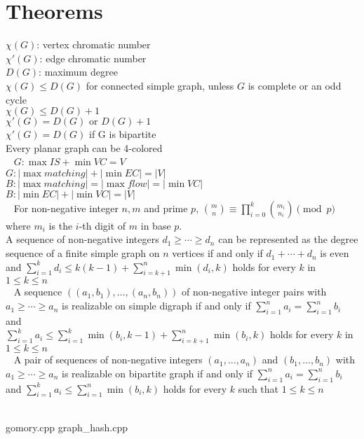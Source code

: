 \documentclass [landscape,8pt,a4paper,twocolumn]{article}
\begin{document}
\part{Theorems}
$\chi(G)$: vertex chromatic number \\
$\chi'(G)$: edge chromatic number \\
$D(G)$: maximum degree \\
$\chi(G) \leq D(G)$ for connected simple graph, unless $G$ is complete or an odd cycle \\
$\chi(G) \leq D(G)+1$ \\
$\chi'(G)=D(G) \text{ or } D(G)+1$ \\
$\chi'(G)=D(G)$ if G is bipartite \\
Every planar graph can be 4-colored \\
~\newline
$G: \max IS+\min VC=V$ \\
$G: |\max matching|+|\min EC|=|V|$ \\
$B: |\max matching|=|\max flow|=|\min VC|$ \\
$B: |\min EC|+|\min VC|=|V|$ \\
~\newline
For non-negative integer $n,m$ and prime $p$, $\binom{m}{n}\equiv\prod_{i=0}^k\binom{m_i}{n_i}\pmod p$\\
	where $m_i$ is the $i$-th digit of $m$ in base $p$. \\
\vfill\null
A sequence of non-negative integers $d_1\geq\cdots\geq d_n$ can be represented as the degree sequence of a finite simple graph on $n$ vertices if and only if $d_1+\cdots+d_n$ is even and $\sum^{k}_{i=1}d_i\leq k(k-1)+ \sum^n_{i=k+1} \min(d_i,k)$
holds for every $k$ in $1\leq k\leq n$ \\
~\newline
A sequence $((a_1,b_1 ),\ldots,(a_n,b_n))$ of non-negative integer pairs with $a_1\geq\cdots\geq a_n$ is realizable on simple digraph if and only if $\sum_{i=1}^{n}a_i=\sum_{i=1}^{n}b_i$ and\\ 
$\sum^k_{i=1} a_i\leq \sum^k_{i=1} \min(b_i,k-1)+ \sum^n_{i=k+1} \min(b_i,k)$ holds for every $k$ in $1 \leq  k \leq n$ \\
~\newline
A pair of sequences of non-negative integers $(a_1,\ldots,a_n)$ and $(b_1,\ldots,b_n)$ with $a_1\geq\cdots\geq a_n$ is realizable on bipartite graph if and only if $\sum_{i=1}^{n}a_i=\sum_{i=1}^{n}b_i$ and $\sum^k_{i=1} a_i\leq \sum^n_{i=1} \min(b_i,k)$ holds for every $k$ such that $1 \leq  k \leq n$ \\
~\newline

 {gomory.cpp}
 {graph_hash.cpp}
\end{document}
